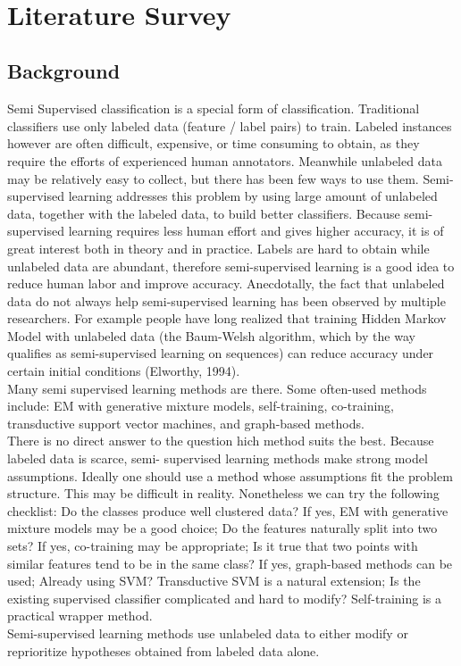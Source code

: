 \documentclass[a4paper,12pt]{article}
\begin{document}
\vspace{0.5cm}
\
\newpage
\section{\fontsize{16pt}{1em}  Literature Survey}


\subsection{ Background}
Semi Supervised classification is a special form of classification. Traditional classifiers use only labeled data (feature / label pairs) to train. Labeled instances however are often difficult, expensive, or time consuming to obtain, as they require the efforts of experienced human annotators. Meanwhile unlabeled data may be relatively easy to collect, but there has been few ways to use them. Semi-supervised learning addresses this problem by using large amount of unlabeled data, together with the labeled data, to build better classifiers. Because semi-supervised learning requires less human effort and gives higher accuracy, it is of great interest both in theory and in practice. Labels are hard to obtain while unlabeled data are abundant, therefore semi-supervised learning is a good idea to reduce human labor and improve accuracy. Anecdotally, the fact that unlabeled data do not always help semi-supervised learning has been observed by multiple researchers. For example people have long realized that training Hidden Markov Model with unlabeled data (the Baum-Welsh algorithm, which by the way qualifies as semi-supervised learning on sequences) can reduce accuracy under certain initial conditions (Elworthy, 1994). \\
Many semi supervised learning methods are there. Some often-used methods include: EM with generative mixture models, self-training, co-training, transductive support vector machines, and graph-based methods. \\
There is no direct answer to the question hich method suits the best. Because labeled data is scarce, semi- supervised learning methods make strong model assumptions. Ideally one should use a method whose assumptions fit the problem structure. This may be difficult in reality. Nonetheless we can try the following checklist: Do the classes produce well clustered data? If yes, EM with generative mixture models may be a good choice; Do the features naturally split into two sets? If yes, co-training may be appropriate; Is it true that two points with similar features tend to be in the same class? If yes, graph-based methods can be used; Already using SVM? Transductive SVM is a natural extension; Is the existing supervised classifier complicated and hard to modify? Self-training is a practical wrapper method. \\
Semi-supervised learning methods use unlabeled data to either modify or reprioritize hypotheses obtained from labeled data alone. \\
\end{document}

